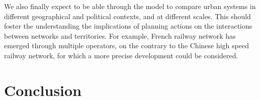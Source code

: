 We also finally expect to be able through the model to compare urban systems in different geographical and political contexts, and at different scales. This should foster the understanding the implications of planning actions on the interactions between networks and territories. For example, French railway network has emerged through multiple operators, on the contrary to the Chinese high speed railway network, for which a more precise development could be considered.



\section*{Conclusion}
























